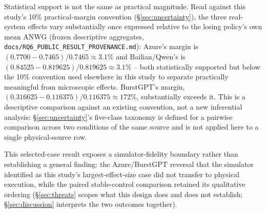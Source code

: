 Statistical support is not the same as practical magnitude. Read against
this study's 10\% practical-margin convention (\S\ref{sec:uncertainty}),
the three real-system effects vary substantially once expressed relative
to the losing policy's own mean ANWG (frozen descriptive aggregates,
\texttt{docs/RQ6\_PUBLIC\_RESULT\_PROVENANCE.md}): Azure's margin is
$(0.7700-0.7465)/0.7465 \approx 3.1\%$ and Bailian/Qwen's is
$(0.84525-0.819625)/0.819625 \approx 3.1\%$ -- both statistically
supported but below the 10\% convention used elsewhere in this study to
separate practically meaningful from microscopic effects. BurstGPT's
margin, $(0.316625-0.116375)/0.116375 \approx 172\%$, substantially
exceeds it. This is a descriptive comparison against an existing
convention, not a new inferential analysis: \S\ref{sec:uncertainty}'s
five-class taxonomy is defined for a pairwise comparison across two
conditions of the same source and is not applied here to a single
physical-source row.

This selected-case result exposes a simulator-fidelity boundary rather
than establishing a general finding: the Azure/BurstGPT reversal that the
simulator identified as this study's largest-effect-size case did not
transfer to physical execution, while the paired stable-control comparison
retained its qualitative ordering (\S\ref{sec:threats} scopes what this
design does and does not establish; \S\ref{sec:discussion} interprets the
two outcomes together).
